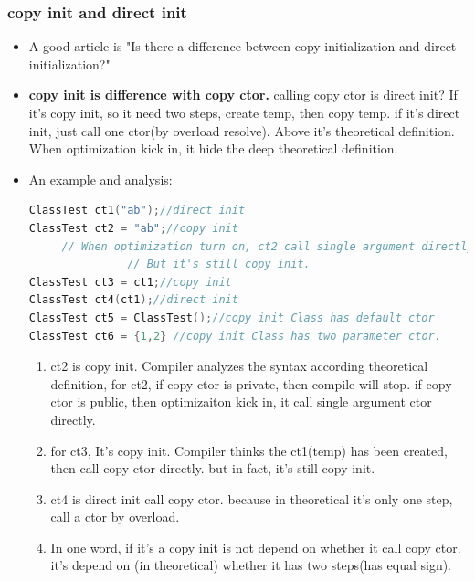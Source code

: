 \documentclass[a4paper,11pt,twoside]{book}
\begin{document}
\subsubsection{copy init and direct init}
\begin{itemize}
	\item A good article is "Is there a difference between copy initialization and direct initialization?"
	
	\item \textbf{copy init is difference with copy ctor.} calling copy ctor is  direct init? If it's copy init, so it need two steps, create temp, then copy temp.  if it's direct init, just call one ctor(by overload resolve). Above it's theoretical definition. When optimization kick in, it hide the deep theoretical definition.   
	
	\item An example and analysis:

\begin{lstlisting}[frame=single, language=c++]
ClassTest ct1("ab");//direct init
ClassTest ct2 = "ab";//copy init 
     // When optimization turn on, ct2 call single argument directly
               // But it's still copy init.
ClassTest ct3 = ct1;//copy init
ClassTest ct4(ct1);//direct init
ClassTest ct5 = ClassTest();//copy init Class has default ctor
ClassTest ct6 = {1,2} //copy init Class has two parameter ctor.
\end{lstlisting}

	\begin{enumerate}
		\item ct2 is copy init. Compiler analyzes the syntax according theoretical definition, for ct2, if copy ctor is private, then compile will stop. if copy ctor is public, then optimizaiton kick in, it call single argument ctor directly.
		
		\item for ct3, It's copy init. Compiler thinks the ct1(temp) has been created, then call copy ctor directly. but in fact, it's still copy init.
		
		\item ct4 is direct init call copy ctor. because in theoretical it's only one step, call a ctor by overload. 
		
		\item In one word, if it's a copy init is not depend on whether it call copy ctor.  it's depend on (in theoretical) whether it has two steps(has equal sign).
	\end{enumerate}


\end{itemize}
\end{document}
